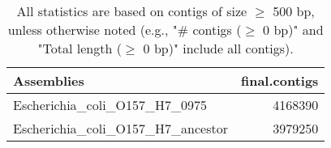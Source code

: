 \documentclass[12pt,a4paper]{article}
\begin{document}
\begin{table}[ht]
\begin{center}
\caption{All statistics are based on contigs of size $\geq$ 500 bp, unless otherwise noted (e.g., "\# contigs ($\geq$ 0 bp)" and "Total length ($\geq$ 0 bp)" include all contigs).}
\begin{tabular}{|l*{1}{|r}|}
\hline
Assemblies & final.contigs \\ \hline
Escherichia\_coli\_O157\_H7\_0975 & 4168390 \\ \hline
Escherichia\_coli\_O157\_H7\_ancestor & 3979250 \\ \hline
\end{tabular}
\end{center}
\end{table}
\end{document}
